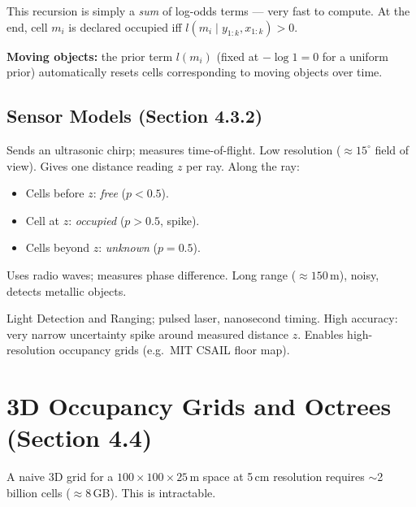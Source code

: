 \documentclass[12pt, a4paper]{article}
\begin{document}
This recursion is simply a \emph{sum} of log-odds terms --- very fast to
compute.  At the end, cell $m_i$ is declared occupied iff
$l(m_i\mid y_{1:k},x_{1:k})>0$.

\textbf{Moving objects:} the prior term $l(m_i)$ (fixed at $-\log 1 = 0$
for a uniform prior) automatically resets cells corresponding to moving
objects over time.

\subsection{Sensor Models (Section 4.3.2)}

\begin{description}[leftmargin=2em]
  \item[Sonar] Sends an ultrasonic chirp; measures time-of-flight. Low
    resolution ($\approx 15^\circ$ field of view). Gives one distance
    reading $z$ per ray. Along the ray:
    \begin{itemize}
      \item Cells before $z$: \emph{free} ($p < 0.5$).
      \item Cell at $z$: \emph{occupied} ($p > 0.5$, spike).
      \item Cells beyond $z$: \emph{unknown} ($p=0.5$).
    \end{itemize}
  \item[Radar] Uses radio waves; measures phase difference. Long range
    ($\approx 150$\,m), noisy, detects metallic objects.
  \item[LiDAR] Light Detection and Ranging; pulsed laser, nanosecond
    timing. High accuracy: very narrow uncertainty spike around
    measured distance $z$. Enables high-resolution occupancy grids
    (e.g.\ MIT CSAIL floor map).
\end{description}

\section{3D Occupancy Grids and Octrees (Section 4.4)}

A naive 3D grid for a $100\times100\times25$\,m space at 5\,cm
resolution requires $\sim$2 billion cells ($\approx$8\,GB). This is
intractable.
\end{document}
